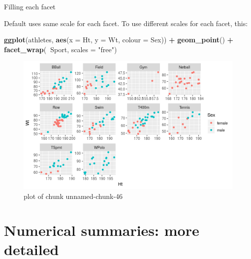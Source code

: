 \documentclass[ignorenonframetext,]{beamer}
\newenvironment{Shaded}{\begin{snugshade}}{\end{snugshade}}
\newcommand{\DataTypeTok}[1]{\textcolor[rgb]{0.13,0.29,0.53}{#1}}
\newcommand{\KeywordTok}[1]{\textcolor[rgb]{0.13,0.29,0.53}{\textbf{#1}}}
\newcommand{\NormalTok}[1]{#1}
\newcommand{\OperatorTok}[1]{\textcolor[rgb]{0.81,0.36,0.00}{\textbf{#1}}}
\newcommand{\StringTok}[1]{\textcolor[rgb]{0.31,0.60,0.02}{#1}}
\begin{document}
\begin{frame}[fragile]{Filling each facet}
\protect\hypertarget{filling-each-facet}{}

Default uses same scale for each facet. To use different scales for each
facet, this:

\begin{Shaded}
\begin{Highlighting}[]
\KeywordTok{ggplot}\NormalTok{(athletes, }\KeywordTok{aes}\NormalTok{(}\DataTypeTok{x =}\NormalTok{ Ht, }\DataTypeTok{y =}\NormalTok{ Wt, }\DataTypeTok{colour =}\NormalTok{ Sex)) }\OperatorTok{+}
\StringTok{  }\KeywordTok{geom_point}\NormalTok{() }\OperatorTok{+}\StringTok{ }\KeywordTok{facet_wrap}\NormalTok{(}\OperatorTok{~}\NormalTok{Sport, }\DataTypeTok{scales =} \StringTok{"free"}\NormalTok{)}
\end{Highlighting}
\end{Shaded}

\begin{figure}
\centering
\includegraphics{figure/unnamed-chunk-46-1.png}
\caption{plot of chunk unnamed-chunk-46}
\end{figure}

\end{frame}

\hypertarget{numerical-summaries-more-detailed}{%
\section{Numerical summaries: more
detailed}\label{numerical-summaries-more-detailed}}
\end{document}
